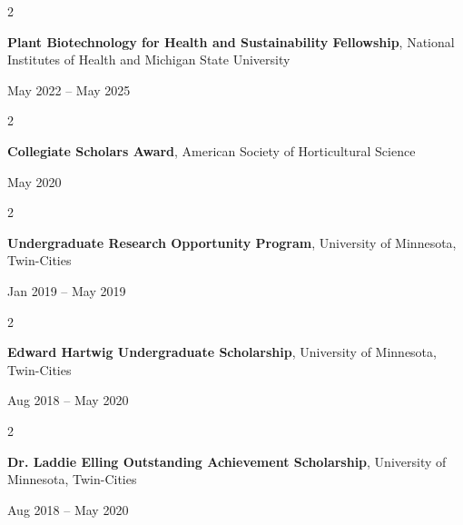 \documentclass[10pt, letterpaper]{article}
\newenvironment{twocolentry}[2][]{
    \onecolentry
    \def\secondColumn{#2}
    \setcolumnwidth{\fill, 4.5 cm}
    \begin{paracol}{2}
}{
    \switchcolumn \raggedleft \secondColumn
    \end{paracol}
    \endonecolentry
} %
\begin{document}
        \vspace{0.2 cm}


        \begin{samepage} 
            \begin{twocolentry}{
                May 2022 – May 2025
                }
                \textbf{Plant Biotechnology for Health and Sustainability Fellowship}, National Institutes of Health and Michigan State University
            \end{twocolentry}
        \end{samepage} 


        \vspace{0.2 cm}


        \begin{samepage} 
            \begin{twocolentry}{
                May 2020
                }
                \textbf{Collegiate Scholars Award}, American Society of Horticultural Science
            \end{twocolentry}
        \end{samepage}  


        \vspace{0.2 cm}
        
        
        \begin{samepage} 
            \begin{twocolentry}{
                Jan 2019 – May 2019
                }
                \textbf{Undergraduate Research Opportunity Program}, University of Minnesota, Twin-Cities
            \end{twocolentry}
        \end{samepage}  


        \vspace{0.2 cm}


        \begin{samepage} 
            \begin{twocolentry}{
                Aug 2018 – May 2020
                }
                \textbf{Edward Hartwig Undergraduate Scholarship}, University of Minnesota, Twin-Cities
            \end{twocolentry}
        \end{samepage}  


        \vspace{0.2 cm}


        \begin{samepage} 
            \begin{twocolentry}{
                Aug 2018 – May 2020
                }
                \textbf{Dr. Laddie Elling Outstanding Achievement Scholarship}, University of Minnesota, Twin-Cities
            \end{twocolentry}
        \end{samepage}  
        
\end{document}
